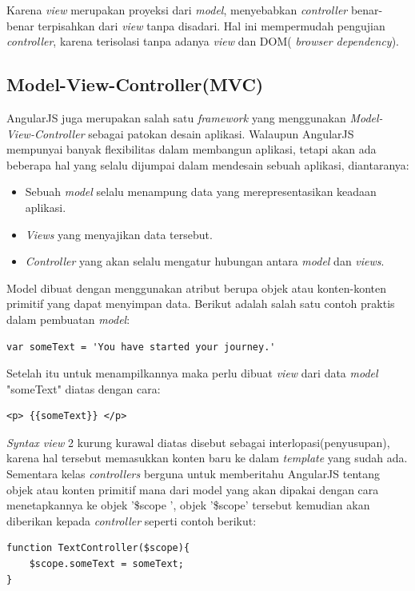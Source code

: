 	Karena \textit{view} merupakan proyeksi dari \textit{model}, menyebabkan \textit{controller} benar-benar terpisahkan dari \textit{view} tanpa disadari. Hal ini mempermudah pengujian \textit{controller}, karena terisolasi tanpa adanya \textit{view} dan DOM( \textit{browser dependency}).
	
\subsection{Model-View-Controller(MVC)}
\label{sub: mvcAngular}

	AngularJS\cite{green2013angularjs} juga merupakan salah satu \textit{framework} yang menggunakan  \textit{Model-View-Controller} sebagai patokan desain aplikasi. Walaupun AngularJS mempunyai banyak flexibilitas dalam membangun aplikasi, tetapi akan ada beberapa hal yang selalu dijumpai dalam mendesain sebuah aplikasi, diantaranya:
	\begin{itemize}
		\item Sebuah \textit{model} selalu menampung data yang merepresentasikan keadaan aplikasi.
		\item \textit{Views} yang menyajikan data tersebut.
		\item \textit{Controller} yang akan selalu mengatur hubungan antara \textit{model} dan \textit{views}.
	\end{itemize}
	
	Model dibuat dengan menggunakan atribut berupa objek atau konten-konten primitif yang dapat menyimpan data. Berikut adalah salah satu contoh praktis dalam pembuatan \textit{model}:
\begin{lstlisting}
var someText = 'You have started your journey.'
\end{lstlisting}
	Setelah itu untuk menampilkannya maka perlu dibuat \textit{view} dari data \textit{model} "someText" diatas dengan cara:
\begin{lstlisting}
<p> {{someText}} </p>
\end{lstlisting}
	\textit{Syntax view} 2 kurung kurawal diatas disebut sebagai interlopasi(penyusupan), karena hal tersebut memasukkan konten baru ke dalam \textit{template} yang sudah ada.\\
	Sementara kelas \textit{controllers} berguna untuk memberitahu AngularJS tentang objek atau konten primitif mana dari model yang akan dipakai dengan cara menetapkannya ke objek '\$scope ', objek '\$scope' tersebut kemudian akan diberikan kepada \textit{controller} seperti contoh berikut:
\begin{lstlisting}
function TextController($scope){
	$scope.someText = someText;
}
\end{lstlisting}
	
